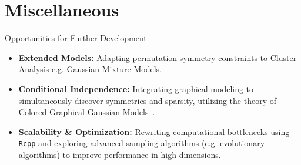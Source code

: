 \documentclass[aspectratio=169,xcolor=dvipsnames]{beamer}
\begin{document}
\section{Miscellaneous}
\begin{frame}{Opportunities for Further Development}
    \begin{itemize}
        \item \textbf{Extended Models:} Adapting permutation symmetry constraints to Cluster Analysis e.g. Gaussian Mixture Models.
        \item \textbf{Conditional Independence:} Integrating graphical modeling to simultaneously discover symmetries and sparsity, utilizing the theory of Colored Graphical Gaussian Models~\cite{chojecki2026newclasscoloredgaussian}.
        \item \textbf{Scalability \& Optimization:} Rewriting computational bottlenecks using \texttt{Rcpp} and exploring advanced sampling algorithms (e.g. evolutionary algorithms) to improve performance in high dimensions.
    \end{itemize}
\end{frame}
\end{document}
